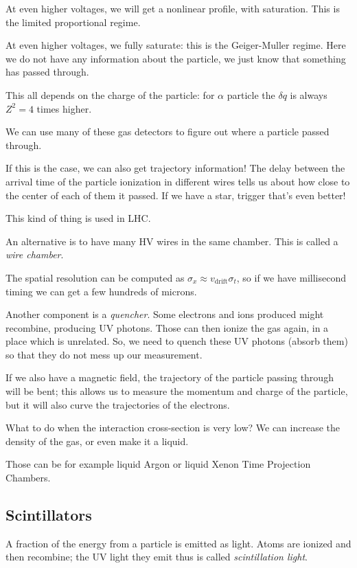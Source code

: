 \documentclass[main.tex]{subfiles}
\begin{document}
At even higher voltages, we will get a nonlinear profile, with saturation. 
This is the limited proportional regime.

At even higher voltages, we fully saturate: this is the Geiger-Muller regime. 
Here we do not have any information about the particle, we just know that 
something has passed through. 

This all depends on the charge of the particle: for \(\alpha \) particle the \(\delta q\) is 
always \(Z^2 = 4\) times higher. 

We can use many of these gas detectors to figure out where a particle passed through. 

If this is the case, we can also get trajectory information! 
The delay between the arrival time of the particle ionization in different wires tells us about
how close to the center of each of them it passed. 
If we have a star, trigger that's even better! 

This kind of thing is used in LHC. 

An alternative is to have many HV wires in the same chamber. 
This is called a \emph{wire chamber}. 

The spatial resolution can be computed as \(\sigma _x \approx v _{\text{drift}} \sigma _t\), 
so if we have millisecond timing we can get a few hundreds of microns. 

Another component is a \emph{quencher}. 
Some electrons and ions produced might recombine, producing UV photons. 
Those can then ionize the gas again, in a place which is unrelated. 
So, we need to quench these UV photons (absorb them) so that they do not mess up 
our measurement.

If we also have a magnetic field, the trajectory of the particle passing through 
will be bent; this allows us to measure the momentum and charge of the particle, but
it will also curve the trajectories of the electrons. 

What to do when the interaction cross-section is very low?
We can increase the density of the gas, or even make it a liquid.

Those can be for example liquid Argon or liquid Xenon Time Projection Chambers.

\subsection{Scintillators}

A fraction of the energy from a particle is emitted as light. 
Atoms are ionized and then recombine; the UV light they emit thus is 
called \emph{scintillation light}. 
\end{document}
